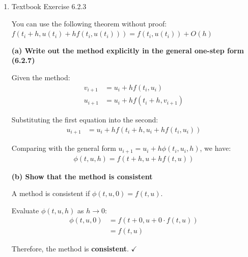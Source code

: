 \documentclass[reqno, answers]{exam}
\begin{document}
\begin{enumerate}
\begin{solution}
          \textit{Exact solution at $t_2 = 1.5$:}
          \begin{align*}
            \hat{u}(1.5) = 1 + \frac{5}{1.5} = 1 + 3.333... \approx 4.3333
          \end{align*}

          \textit{Error:} $|u_2 - \hat{u}(1.5)| = |4.0 - 4.3333| = 0.3333$

        \end{solution}


  \item Textbook Exercise 6.2.3

        You can use the following theorem without proof: $f(t_i + h, u(t_i) + h f(t_i, u(t_i))) = f(t_i, u(t_i)) + O(h)$
        \begin{solution}
          \textbf{(a) Write out the method explicitly in the general one-step form (6.2.7)}

          Given the method:
          \begin{align*}
            v_{i+1} & = u_i + h f(t_i, u_i)         \\
            u_{i+1} & = u_i + h f(t_i + h, v_{i+1})
          \end{align*}

          Substituting the first equation into the second:
          \begin{align*}
            u_{i+1} & = u_i + h f(t_i + h, u_i + h f(t_i, u_i))
          \end{align*}

          Comparing with the general form $u_{i+1} = u_i + h\phi(t_i, u_i, h)$, we have:
          \begin{align*}
            \boxed{\phi(t, u, h) = f(t + h, u + h f(t, u))}
          \end{align*}

          \medskip

          \textbf{(b) Show that the method is consistent}

          A method is consistent if $\phi(t, u, 0) = f(t, u)$.

          Evaluate $\phi(t, u, h)$ as $h \to 0$:
          \begin{align*}
            \phi(t, u, 0) & = f(t + 0, u + 0 \cdot f(t, u)) \\
                          & = f(t, u)
          \end{align*}

          Therefore, the method is \textbf{consistent}. $\checkmark$


\end{solution}
\end{enumerate}
\end{document}

